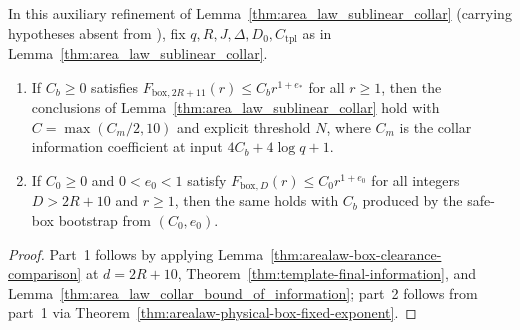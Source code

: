 \begin{lemma}
    \label{thm:area_law_sublinear_collar_named}
    \leanok
    In this auxiliary refinement of Lemma~\ref{thm:area_law_sublinear_collar}
    (carrying hypotheses absent from \cite[Proposition~9.6]{OpenAI2026AreaLaw}),
    fix $q,R,J,\Delta,D_0,C_{\mathrm{tpl}}$ as in
    Lemma~\ref{thm:area_law_sublinear_collar}.
    \begin{enumerate}
        \item If $C_b\geq0$ satisfies
              $F_{\mathrm{box},2R+11}(r)\leq C_br^{1+e_*}$ for all $r\geq1$,
              then the conclusions of Lemma~\ref{thm:area_law_sublinear_collar}
              hold with $C=\max(C_m/2,10)$ and explicit threshold $N$, where
              $C_m$ is the collar information coefficient at input
              $4C_b+4\log q+1$.
        \item If $C_0\geq0$ and $0<e_0<1$ satisfy
              $F_{\mathrm{box},D}(r)\leq C_0r^{1+e_0}$ for all integers
              $D>2R+10$ and $r\geq1$, then the same holds with $C_b$ produced by
              the safe-box bootstrap from $(C_0,e_0)$.
    \end{enumerate}
\end{lemma}
\begin{proof}\leanok
    Part~1 follows by applying
    Lemma~\ref{thm:arealaw-box-clearance-comparison} at $d=2R+10$,
    Theorem~\ref{thm:template-final-information}, and
    Lemma~\ref{thm:area_law_collar_bound_of_information}; part~2 follows from
    part~1 via Theorem~\ref{thm:arealaw-physical-box-fixed-exponent}.
\end{proof}

